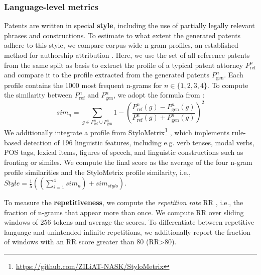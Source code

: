 \subsubsection{Language-level metrics}

Patents are written in special \textbf{style}, including the use of partially legally relevant phrases and constructions. 
To estimate to what extent the generated patents adhere to this style, we compare corpus-wide n-gram profiles, an established method for authorship attribution \cite{kesVeljNGRAMBASEDAUTHORPROFILES2003,Zecevic2011NgramBT,Dam2013ABC,Mikros2013AuthorshipAI}.
Here, we use the set of all reference patents from the same split as basis to extract the profile of a typical patent attorney $P^n_\text{ref}$ and compare it to the profile extracted from the generated patents $P^n_\text{gen}$.
Each profile contains the 1000 most frequent n-grams for $n \in \{1,2,3,4\}$.
To compute the similarity between $P^n_\text{ref}$ and $P^n_\text{gen}$, we adopt the formula from \citet{kesVeljNGRAMBASEDAUTHORPROFILES2003}:
\[sim_n = \sum_{g \in P^n_\text{ref} \cup P^n_\text{gen}} 1 - \left(\frac{P^n_\text{ref}(g) - P^n_\text{gen}(g)}{P^n_\text{ref}(g) + P^n_\text{gen}(g)}\right)^2\]
We additionally integrate a profile from StyloMetrix\footnote{\href{https://github.com/ZILiAT-NASK/StyloMetrix}{https://github.com/ZILiAT-NASK/StyloMetrix}} \cite{okulskaStyloMetrixOpenSourceMultilingual2023},
which implements rule-based detection of 196 linguistic features, including e.g. verb tenses, modal verbs, POS tags, lexical items, figures of speech, and linguistic constructions such as fronting or similes.
We compute the final score as the average of the four n-gram profile similarities and the StyloMetrix profile similarity, i.e., $Style = \frac{1}{5} ((\sum_{i=1}^4 {sim_n}) + sim_{stylo})$. 

To measure the \textbf{repetitiveness}, we compute the \textit{repetition rate} RR \cite{cettoloRepetitionRateText2014}, i.e., the fraction of n-grams that appear more than once.
We compute RR over sliding windows of 256 tokens and average the scores.
To differentiate between repetitive language and unintended infinite repetitions, we additionally report the fraction of windows with an RR score greater than 80 (RR>80).


